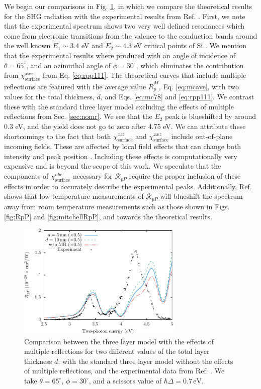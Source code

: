 We begin our comparisons in Fig. \ref{fig:average}, in which we compare the
theoretical results for the SHG radiation with the experimental results from
Ref. \cite{mejiaPRB02}. First, we note that the experimental spectrum shows two
very well defined resonances which come from electronic transitions from the
valence to the conduction bands around the well known $E_{1}\sim 3.4$ eV and
$E_{2}\sim 4.3$ eV critical points of Si \cite{yubook}. We mention that the
experimental results where produced with an angle of incidence of
$\theta=65^\circ$, and an azimuthal angle of $\phi=30^\circ$, which eliminates
the contribution from $\chi^{xxx}_{\mathrm{surface}}$ from Eq.
\eqref{eq:rpp111}. The theoretical curves that include multiple reflections are
featured with the average value $\bar{R}^{M}_{p}$, Eq.
\eqref{eq:mcave}, with two values for the total thickness, $d$, and Eqs.
\eqref{eq:mc78} and \eqref{eq:rpp111}. We contrast these with the standard three
layer model excluding the effects of multiple reflections from Sec.
\ref{sec:nomr}. We see that the $E_{2}$ peak is blueshifted by around 0.3 eV,
and the yield does not go to zero after 4.75 eV. We can attribute these
shortcomings to the fact that both $\chi^{zzz}_{\mathrm{surface}}$ and
$\chi^{xxz}_{\mathrm{surface}}$ include out-of-plane incoming fields. These are
affected by local field effects that can change both intensity and peak position
\cite{tancognedejean:tel-01235611}. Including these effects is computationally
very expensive and is beyond the scope of this work. We speculate that the
components of $\chi^{abc}_{\mathrm{surface}}$ necessary for $\mathcal{R}_{pP}$
require the proper inclusion of these effects in order to accurately describe
the experimental peaks. Additionally, Ref. \cite{dadapPRB97} shows that low
temperature measurements of $\mathcal{R}_{pP}$ will blueshift the spectrum away
from room temperature measurements such as those shown in Figs. \ref{fig:RpP}
and \ref{fig:mitchellRpP}, and towards the theoretical results.

\begin{figure}[H]
\centering
\includegraphics[width=0.7\textwidth]{content/figures/fig-Si1x1-MRthickness}
\caption{Comparison between the three layer model with the effects of multiple
reflections for two different values of the total layer thickness $d$, with the
standard three layer model without the effects of multiple reflections, and the
experimental data from Ref. \cite{mejiaPRB02}. We take $\theta=65^{\circ}$,
$\phi=30^{\circ}$, and a scissors value of $\hbar\Delta = 0.7\,\text{eV}$.}
\label{fig:average}
\end{figure}

